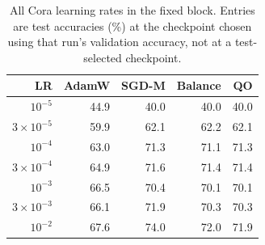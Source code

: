 \begin{table}[ht]
\centering\small
\caption{All Cora learning rates in the fixed block. Entries are test accuracies (\%) at the checkpoint chosen using that run's validation accuracy, not at a test-selected checkpoint.}
\label{tab:fresh-cora-all}
\begin{tabular}{rrrrr}
\toprule LR & AdamW & SGD-M & Balance & QO\\\midrule
$10^{-5}$ & 44.9 & 40.0 & 40.0 & 40.0\\
$3\times10^{-5}$ & 59.9 & 62.1 & 62.2 & 62.1\\
$10^{-4}$ & 63.0 & 71.3 & 71.1 & 71.3\\
$3\times10^{-4}$ & 64.9 & 71.6 & 71.4 & 71.4\\
$10^{-3}$ & 66.5 & 70.4 & 70.1 & 70.1\\
$3\times10^{-3}$ & 66.1 & 71.9 & 70.3 & 70.3\\
$10^{-2}$ & 67.6 & 74.0 & 72.0 & 71.9\\
\bottomrule
\end{tabular}
\end{table}
